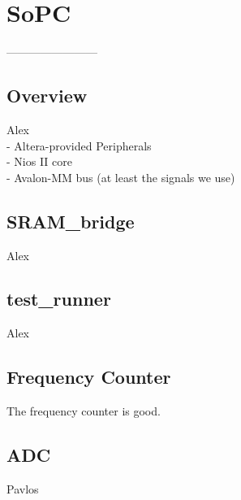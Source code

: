 \chapter{SoPC}
------------------------

\section{Overview}
Alex \\
   - Altera-provided Peripherals \\
   - Nios II core \\
   - Avalon-MM bus (at least the signals we use)

\section{SRAM\_bridge}
Alex

\section{test\_runner}
Alex \\


\section{Frequency Counter}

The frequency counter is good.


\section{ADC}
Pavlos